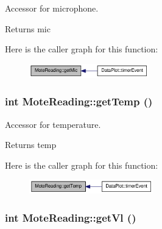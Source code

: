 Accessor for microphone. 

\begin{DoxyReturn}{Returns}
mic 
\end{DoxyReturn}


Here is the caller graph for this function:\nopagebreak
\begin{figure}[H]
\begin{center}
\leavevmode
\includegraphics[width=147pt]{classMoteReading_a348cb45f4613499385a354fe6857ef5d_icgraph}
\end{center}
\end{figure}


\hypertarget{classMoteReading_a3f7526c29f2bf61feeb5e24298133332}{
\subsubsection[{getTemp}]{\setlength{\rightskip}{0pt plus 5cm}int MoteReading::getTemp ()}}
\label{classMoteReading_a3f7526c29f2bf61feeb5e24298133332}


Accessor for temperature. 

\begin{DoxyReturn}{Returns}
temp 
\end{DoxyReturn}


Here is the caller graph for this function:\nopagebreak
\begin{figure}[H]
\begin{center}
\leavevmode
\includegraphics[width=152pt]{classMoteReading_a3f7526c29f2bf61feeb5e24298133332_icgraph}
\end{center}
\end{figure}


\hypertarget{classMoteReading_a88ed6ea245c7af79e38ff8976f849f36}{
\subsubsection[{getVl}]{\setlength{\rightskip}{0pt plus 5cm}int MoteReading::getVl ()}}
\label{classMoteReading_a88ed6ea245c7af79e38ff8976f849f36}



